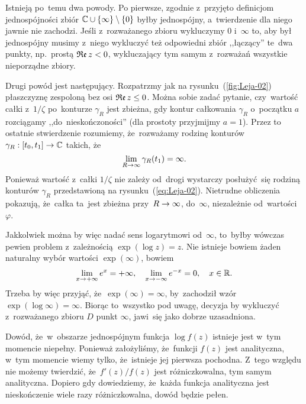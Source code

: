 \documentclass[a4paper,11pt]{article}
\begin{document}
Istnieją po~temu dwa powody. Po pierwsze, zgodnie z~przyjęto
definicjom jednospójności zbiór
$\mathbb{C} \cup \{  \infty  \} \setminus \{  0  \}$ byłby jednospójny,
a~twierdzenie dla niego jawnie nie zachodzi. Jeśli z~rozważanego
zbioru wykluczymy $0$ i~$\infty$ to, aby był jednospójny musimy
z~niego wykluczyć też odpowiedni zbiór ,,łączący'' te~dwa punkty,
np.~prostą $\mathfrak{Re}\, z < 0$, wykluczający tym samym z~rozważań
wszystkie nieporządne zbiory.

Drugi powód jest następujący. Rozpatrzmy jak na
rysunku~(\ref{fig:Leja-02}) płaszczyznę zespoloną bez osi
$\mathfrak{Re}\, z \leq 0$. Można sobie zadać pytanie, czy~wartość całki
z~$1 / \zeta$ po~konturze $\gamma_{ R }$ jest zbieżna, gdy kontur
całkowania $\gamma_{ R }$ o~początku $a$ rozciągamy
,,do~nieskończoności'' (dla prostoty przyjmijmy $a = 1$). Przez to
ostatnie stwierdzenie rozumiemy, że~rozważamy rodzinę konturów
$\gamma_{ R }: [ t_{ 0 }, t_{ 1 } ] \to \mathbb{C}$ takich, że
\begin{equation}
  \label{eq:Leja-39}
  \lim\limits_{ R \to \infty } \gamma_{ R }( t_{ 1 } ) = \infty.
\end{equation}
Ponieważ wartość z~całki $1 / \zeta$ nie zależy od~drogi wystarczy
posłużyć~się rodziną konturów $\gamma_{ R }$ przedstawioną na
rysunku~(\ref{eq:Leja-02}). Nietrudne obliczenia pokazują, że~całka
ta~jest zbieżna przy~$R \to \infty$, do~$\infty$, niezależnie
od~wartości~$\varphi$.

Jakkolwiek można by więc nadać sens logarytmowi od~$\infty$, to~byłby
wówczas pewien problem z~zależnością $\exp( \log z ) = z$. Nie
istnieje bowiem żaden naturalny wybór wartości $\exp( \infty )$,
bowiem
\begin{equation}
  \label{eq:Leja-40}
  \begin{split}
    \lim\limits_{ x \to +\infty } e^{ x } = +\infty, \quad \lim\limits_{ x \to -\infty } e^{
      -x } = 0, \quad x \in \mathbb{R}.
  \end{split}
\end{equation}
Trzeba by więc przyjąć, że~$\exp( \infty ) = \infty$, by~zachodził
wzór $\exp( \log \infty ) = \infty$. Biorąc to~wszystko pod uwagę,
decyzja by wykluczyć z~rozważanego zbioru $D$ punkt $\infty$, jawi~się
jako dobrze uzasadniona.

\vspace{\spaceFour}


\start {} Dowód, że~w~obszarze jednospójnym funkcja
$\log f( z )$ istnieje jest w~tym momencie niepełny. Ponieważ
założyliśmy, że~funkcji $f( z )$ jest analityczna, w~tym momencie
wiemy tylko, że~istnieje jej pierwsza pochodna. Z~tego względu nie
możemy twierdzić, że~$f'( z ) / f( z )$ jest różniczkowalna, tym samym
analityczna. Dopiero gdy dowiedziemy, że~każda funkcja analityczna
jest nieskończenie wiele razy różniczkowalna, dowód będzie pełen.
\end{document}
